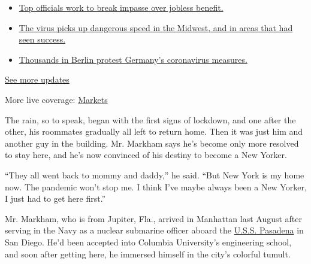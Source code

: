\begin{itemize}
\tightlist
\item
  \href{https://www.nytimes3xbfgragh.onion/2020/08/01/world/coronavirus-covid-19.html?action=click\&pgtype=Article\&state=default\&region=MAIN_CONTENT_1\&context=storylines_live_updates\#link-3ac56579}{Top
  officials work to break impasse over jobless benefit.}
\item
  \href{https://www.nytimes3xbfgragh.onion/2020/08/01/world/coronavirus-covid-19.html?action=click\&pgtype=Article\&state=default\&region=MAIN_CONTENT_1\&context=storylines_live_updates\#link-8796723}{The
  virus picks up dangerous speed in the Midwest, and in areas that had
  seen success.}
\item
  \href{https://www.nytimes3xbfgragh.onion/2020/08/01/world/coronavirus-covid-19.html?action=click\&pgtype=Article\&state=default\&region=MAIN_CONTENT_1\&context=storylines_live_updates\#link-25930521}{Thousands
  in Berlin protest Germany's coronavirus measures.}
\end{itemize}

\href{https://www.nytimes3xbfgragh.onion/2020/08/01/world/coronavirus-covid-19.html?action=click\&pgtype=Article\&state=default\&region=MAIN_CONTENT_1\&context=storylines_live_updates}{See
more updates}

More live coverage:
\href{https://www.nytimes3xbfgragh.onion/live/2020/07/31/business/stock-market-today-coronavirus?action=click\&pgtype=Article\&state=default\&region=MAIN_CONTENT_1\&context=storylines_live_updates}{Markets}

The rain, so to speak, began with the first signs of lockdown, and one
after the other, his roommates gradually all left to return home. Then
it was just him and another guy in the building. Mr. Markham says he's
become only more resolved to stay here, and he's now convinced of his
destiny to become a New Yorker.

``They all went back to mommy and daddy,'' he said. ``But New York is my
home now. The pandemic won't stop me. I think I've maybe always been a
New Yorker, I just had to get here first.''

Mr. Markham, who is from Jupiter, Fla., arrived in Manhattan last August
after serving in the Navy as a nuclear submarine officer aboard the
\href{https://www.csp.navy.mil/pasadena/About/}{U.S.S. Pasadena} in San
Diego. He'd been accepted into Columbia University's engineering school,
and soon after getting here, he immersed himself in the city's colorful
tumult.

